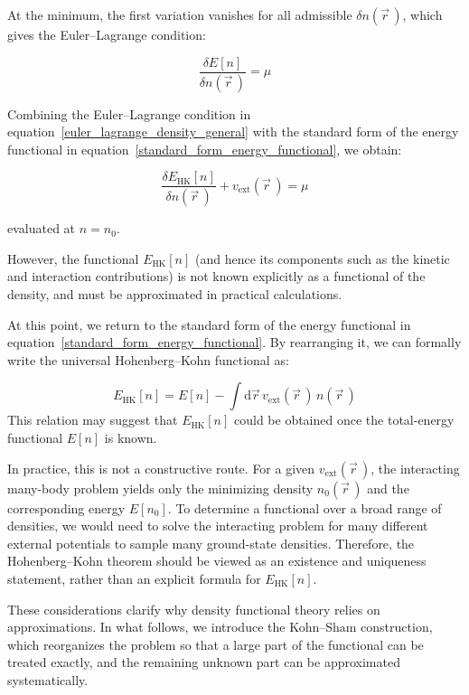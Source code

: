 At the minimum, the first variation vanishes for all admissible $\delta n(\vec{r}\,)$, which gives the Euler--Lagrange condition:

\begin{equation}
    \frac{\delta E[n]}{\delta n(\vec{r}\,)} = \mu
\label{euler_lagrange_density_general}
\end{equation}

Combining the Euler--Lagrange condition in equation~\eqref{euler_lagrange_density_general} with the standard form of the energy functional in equation~\eqref{standard_form_energy_functional}, we obtain:

\begin{equation}
    \frac{\delta E_\mathrm{HK}[n]}{\delta n(\vec{r}\,)} + v_\mathrm{ext}(\vec{r}\,) = \mu
\label{euler_lagrange_density_functional}
\end{equation}

evaluated at $n=n_0$.

However, the functional $E_\mathrm{HK}[n]$ (and hence its components such as the kinetic and interaction contributions)
is not known explicitly as a functional of the density, and must be approximated in practical calculations.

At this point, we return to the standard form of the energy functional in equation~\eqref{standard_form_energy_functional}. By rearranging it, we can formally write the universal Hohenberg--Kohn functional as:

\begin{equation}
    E_\mathrm{HK}[n] = E[n]-\int\mathrm{d}\vec{r}\,v_\mathrm{ext}(\vec{r}\,)\,n(\vec{r}\,)
\label{formal_FHK_as_difference}
\end{equation}
This relation may suggest that $E_\mathrm{HK}[n]$ could be obtained once the total-energy functional $E[n]$ is known.

In practice, this is not a constructive route.
For a given $v_\mathrm{ext}(\vec{r}\,)$, the interacting many-body problem yields only the minimizing density $n_0(\vec{r}\,)$ and the corresponding energy $E[n_0]$.
To determine a functional over a broad range of densities, we would need to solve the interacting problem for many different external potentials to sample many ground-state densities.
Therefore, the Hohenberg--Kohn theorem should be viewed as an existence and uniqueness statement, rather than an explicit formula for $E_\mathrm{HK}[n]$. 

These considerations clarify why density functional theory relies on approximations.
In what follows, we introduce the Kohn--Sham construction,
which reorganizes the problem so that a large part of the functional can be treated exactly,
and the remaining unknown part can be approximated systematically.



